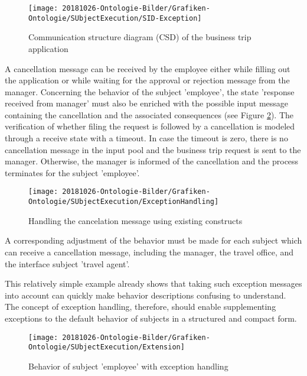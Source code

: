 \begin{figure}[ph!]
	\centering
	\texttt{[image: 20181026-Ontologie-Bilder/Grafiken-Ontologie/SUbjectExecution/SID-Exception]}
	\caption[Communication structure diagram (CSD) of the business trip application]{Communication structure diagram (CSD) of the business trip application}
	\label{fig:sid-exception}
\end{figure}

A cancellation message can be received by the employee either while filling out the application or while waiting for the approval or rejection message from the manager. Concerning the behavior of the subject 'employee', the state 'response received from manager' must also be enriched with the possible input message containing the cancellation and the associated consequences (see Figure \ref{fig:exceptionhandling}). The verification of whether filing the request is followed by a cancellation is modeled through a receive state with a timeout. In case the timeout is zero, there is no cancellation message in the input pool and the business trip request is sent to the manager. Otherwise, the manager is informed of the cancellation and the process terminates for the subject 'employee'.


\begin{figure}[htbp]
	\centering
	\texttt{[image: 20181026-Ontologie-Bilder/Grafiken-Ontologie/SUbjectExecution/ExceptionHandling]}
	\caption[Handling the cancelation message using existing constructs]{Handling the cancelation message using existing constructs}
	\label{fig:exceptionhandling}
\end{figure}

A corresponding adjustment of the behavior must be made for each subject which can receive a cancellation message, including the manager, the travel office, and the interface subject 'travel agent'.

This relatively simple example already shows that taking such exception messages into account can quickly make behavior descriptions confusing to understand. The concept of exception handling, therefore, should enable supplementing exceptions to the default behavior of subjects in a structured and compact form. 

\begin{figure}[htbp]
	\centering
	\texttt{[image: 20181026-Ontologie-Bilder/Grafiken-Ontologie/SUbjectExecution/Extension]}
	\caption[Behavior of subject 'employee' with exception handling]{Behavior of subject 'employee' with exception handling}
	\label{fig:extension}
\end{figure}

